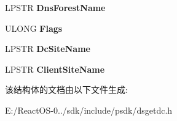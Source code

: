 \begin{DoxyCompactItemize}
L\+P\+S\+TR {\bfseries Dns\+Forest\+Name}
\item 
\mbox{\label{struct___d_o_m_a_i_n___c_o_n_t_r_o_l_l_e_r___i_n_f_o_a_ab02016a665fc89b6965dcbc35fc76656}} 
U\+L\+O\+NG {\bfseries Flags}
\item 
\mbox{\label{struct___d_o_m_a_i_n___c_o_n_t_r_o_l_l_e_r___i_n_f_o_a_a5468da420f692ecce75591a77df921f3}} 
L\+P\+S\+TR {\bfseries Dc\+Site\+Name}
\item 
\mbox{\label{struct___d_o_m_a_i_n___c_o_n_t_r_o_l_l_e_r___i_n_f_o_a_ab2b5380819a047ebec3f0a76bfcf1661}} 
L\+P\+S\+TR {\bfseries Client\+Site\+Name}
\end{DoxyCompactItemize}


该结构体的文档由以下文件生成\+:\begin{DoxyCompactItemize}
\item 
E\+:/\+React\+O\+S-\/0../sdk/include/psdk/dsgetdc.\+h\end{DoxyCompactItemize}
